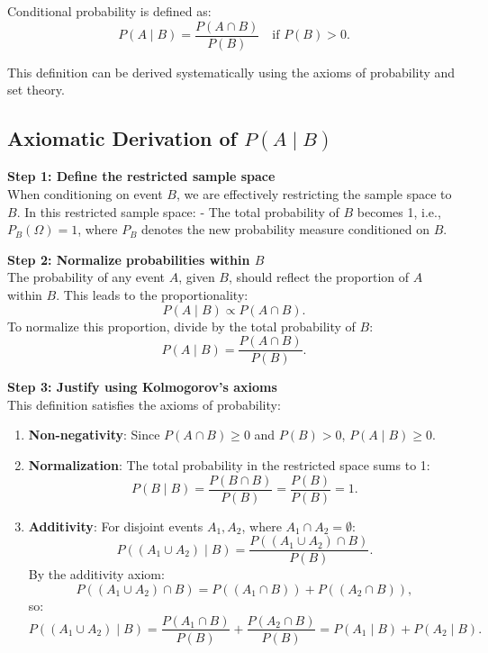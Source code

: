 \documentclass[
  12 pt,
  a4paper,
]{book}
\providecommand{\tightlist}{%
  \setlength{\itemsep}{0pt}\setlength{\parskip}{0pt}}
\numberwithin{equation}{section}
\theoremstyle{plain}      %
\theoremstyle{definition} %
\theoremstyle{remark}     %
\theoremstyle{note}         %
\begin{document}
Conditional probability is defined as: \[
P(A \mid B) = \frac{P(A \cap B)}{P(B)} \quad \text{if } P(B) > 0.
\]

This definition can be derived systematically using the axioms of
probability and set theory.

\hypertarget{axiomatic-derivation-of-pa-mid-b}{%
\subsection{\texorpdfstring{Axiomatic Derivation of
\(P(A \mid B)\)}{Axiomatic Derivation of P(A \textbackslash mid B)}}\label{axiomatic-derivation-of-pa-mid-b}}

\textbf{Step 1: Define the restricted sample space}\\
When conditioning on event \(B\), we are effectively restricting the
sample space to \(B\). In this restricted sample space: - The total
probability of \(B\) becomes 1, i.e., \(P_B(\Omega) = 1\), where \(P_B\)
denotes the new probability measure conditioned on \(B\).

\textbf{Step 2: Normalize probabilities within \(B\)}\\
The probability of any event \(A\), given \(B\), should reflect the
proportion of \(A\) within \(B\). This leads to the proportionality: \[
P(A \mid B) \propto P(A \cap B).
\] To normalize this proportion, divide by the total probability of
\(B\): \[
P(A \mid B) = \frac{P(A \cap B)}{P(B)}.
\]

\textbf{Step 3: Justify using Kolmogorov's axioms}\\
This definition satisfies the axioms of probability:

\begin{enumerate}
\def\labelenumi{\arabic{enumi}.}
\tightlist
\item
  \textbf{Non-negativity}: Since \(P(A \cap B) \geq 0\) and
  \(P(B) > 0\), \(P(A \mid B) \geq 0\).
\item
  \textbf{Normalization}: The total probability in the restricted space
  sums to 1: \[
  P(B \mid B) = \frac{P(B \cap B)}{P(B)} = \frac{P(B)}{P(B)} = 1.
  \]
\item
  \textbf{Additivity}: For disjoint events \(A_1, A_2\), where
  \(A_1 \cap A_2 = \emptyset\): \[
  P((A_1 \cup A_2) \mid B) = \frac{P((A_1 \cup A_2) \cap B)}{P(B)}.
  \] By the additivity axiom: \[
  P((A_1 \cup A_2) \cap B) = P((A_1 \cap B)) + P((A_2 \cap B)),
  \] so: \[
  P((A_1 \cup A_2) \mid B) = \frac{P(A_1 \cap B)}{P(B)} + \frac{P(A_2 \cap B)}{P(B)} = P(A_1 \mid B) + P(A_2 \mid B).
  \]
\end{enumerate}
\end{document}
